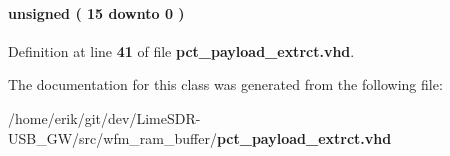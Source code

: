 \paragraph[{wr\+\_\+cnt}]{ {\bfseries \textcolor{comment}{unsigned}\textcolor{vhdlchar}{ }\textcolor{vhdlchar}{(}\textcolor{vhdlchar}{ }\textcolor{vhdlchar}{ } \textcolor{vhdldigit}{15} \textcolor{vhdlchar}{ }\textcolor{keywordflow}{downto}\textcolor{vhdlchar}{ }\textcolor{vhdlchar}{ } \textcolor{vhdldigit}{0} \textcolor{vhdlchar}{ }\textcolor{vhdlchar}{)}\textcolor{vhdlchar}{ }} \hspace{0.3cm}{\ttfamily [Signal]}}\label{classpct__payload__extrct_1_1arch_ad68f02da61bc6bfa461509d5a1bd5397}


Definition at line {\bf 41} of file {\bf pct\+\_\+payload\+\_\+extrct.\+vhd}.



The documentation for this class was generated from the following file\+:\begin{DoxyCompactItemize}
\item 
/home/erik/git/dev/\+Lime\+S\+D\+R-\/\+U\+S\+B\+\_\+\+G\+W/src/wfm\+\_\+ram\+\_\+buffer/{\bf pct\+\_\+payload\+\_\+extrct.\+vhd}\end{DoxyCompactItemize}
